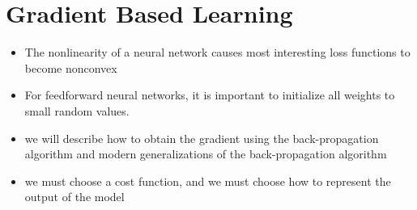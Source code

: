 \documentclass{beamer}
\begin{document}
\section{Gradient Based Learning}
\begin{frame}
\begin{itemize}
	\item The nonlinearity of a neural network causes most interesting loss functions to become nonconvex
	\item For feedforward neural networks, it is important to
initialize all weights to small random values. 
\item we will describe how to obtain the gradient using the back-propagation
algorithm and modern generalizations of the back-propagation algorithm
\item we must choose a cost function, and we must choose how to represent the output of the model
	
\end{itemize}
\end{frame}
\end{document}
